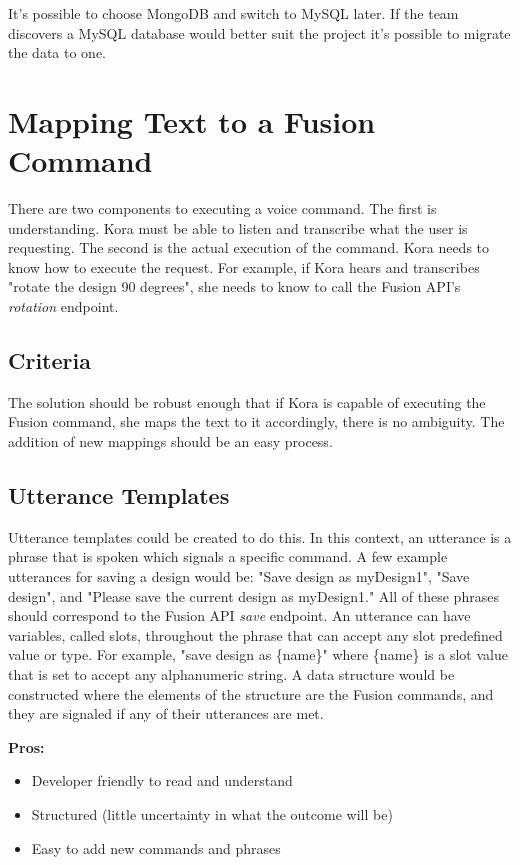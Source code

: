 \documentclass[onecolumn, draftclsnofoot,10pt, compsoc]{IEEEtran}
\begin{document}
			It's possible to choose MongoDB and switch to MySQL later.
			If the team discovers a MySQL database would better suit the project it's possible to migrate the data to one. 



	
	\section{Mapping Text to a Fusion Command}
			There are two components to executing a voice command. 
			The first is understanding.
			Kora must be able to listen and transcribe what the user is requesting.
			The second is the actual execution of the command.
			Kora needs to know how to execute the request. 
			For example, if Kora hears and transcribes "rotate the design 90 degrees", she needs to know to call the Fusion API's \textit{rotation} endpoint.
			
			\subsection{Criteria}
				The solution should be robust enough that if Kora is capable of executing the Fusion command, she maps the text to it accordingly, there is no ambiguity.
				The addition of new mappings should be an easy process.
			
			
			\subsection{Utterance Templates}
				Utterance templates could be created to do this.
				In this context, an utterance is a phrase that is spoken which signals a specific command.
				A few example utterances for saving a design would be: "Save design as myDesign1", "Save design", and "Please save the current design as myDesign1."
				All of these phrases should correspond to the Fusion API \textit{save} endpoint.
				An utterance can have variables, called slots, throughout the phrase that can accept any slot predefined value or type.
				For example, "save design as \{name\}" where \{name\} is a slot value that is set to accept any alphanumeric string.
				A data structure would be constructed where the elements of the structure are the Fusion commands, and they are signaled if any of their utterances are met.
			
				\textbf{Pros:}
					\begin{itemize}
						\item{
						Developer friendly to read and understand}
					\item{
						Structured (little uncertainty in what the outcome will be)}
					\item{
						Easy to add new commands and phrases}
					\end{itemize}
				
\end{document}
